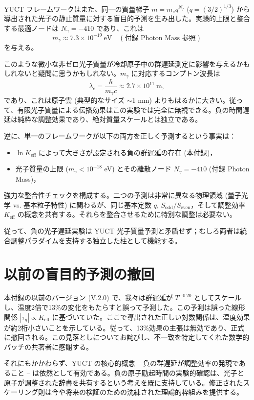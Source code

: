 \documentclass[12pt,a4paper]{article}
\newcommand{\Keff}{K_{\mathrm{eff}}}
\begin{document}
	YUCT フレームワークはまた、同一の質量梯子 \(m = m_e q^{N_f}\) (\(q=(3/2)^{1/3}\)) から導出された光子の静止質量に対する盲目的予測を生み出した。実験的上限と整合する最適ノードは \(N_\gamma = -410\) であり、これは
	\[
	m_\gamma \approx 7.3 \times 10^{-19}~\text{eV} \quad (\text{付録 Photon Mass 参照})
	\]
	を与える。
	
	このような微小な非ゼロ光子質量が冷却原子中の群遅延測定に影響を与えるかもしれないと疑問に思うかもしれない。\(m_\gamma\) に対応するコンプトン波長は
	\[
	\lambda_c = \frac{\hbar}{m_\gamma c} \approx 2.7\times10^{11}~\text{m},
	\]
	であり、これは原子雲 (典型的なサイズ \(\sim 1\) mm) よりもはるかに大きい。従って、有限光子質量による伝播効果はこの実験では完全に無視できる。負の時間遅延は純粋な調整効果であり、絶対質量スケールとは独立である。
	
	逆に、単一のフレームワークが以下の両方を正しく予測するという事実は：
	\begin{itemize}
		\item \(\ln\Keff\) によって大きさが設定される負の群遅延の存在 (本付録)，
		\item 光子質量の上限 (\(m_\gamma < 10^{-18}\) eV) とその離散ノード \(N_\gamma = -410\) (付録 Photon Mass)，
	\end{itemize}
	強力な整合性チェックを構成する。二つの予測は非常に異なる物理領域 (量子光学 vs. 基本粒子特性) に関わるが、同じ基本定数 \(q\), \(S_{\mathrm{odd}}/S_{\mathrm{even}}\)，そして調整効率 \(\Keff\) の概念を共有する。それらを整合させるために特別な調整は必要ない。
	
	従って、負の光子遅延実験は YUCT 光子質量予測と矛盾せず；むしろ両者は統合調整パラダイムを支持する独立した柱として機能する。
	
	\section{以前の盲目的予測の撤回}
	
	本付録の以前のバージョン (V.2.0) で、我々は群遅延が \(T^{-0.20}\) としてスケールし、温度2倍で13\%の変化をもたらすと誤って予測した。この予測は誤った線形関係 \(|\tau_g| \propto \Keff\) に基づいていた。ここで導出された正しい対数関係は、温度効果が約2桁小さいことを示している。従って、13\%効果の主張は無効であり、正式に撤回される。この見落としについてお詫びし、不一致を特定してくれた数学的パッチの共著者に感謝する。
	
	それにもかかわらず、YUCT の核心的概念 – 負の群遅延が調整効率の発現であること – は依然として有効である。負の原子励起時間の実験的確認は、光子と原子が調整された辞書を共有するという考えを既に支持している。修正されたスケーリング則は今や将来の検証のための洗練された理論的枠組みを提供する。
	
\end{document}
